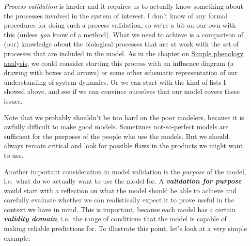 \documentclass[
]{book}
\begin{document}
\emph{Process validation} is harder and it requires us to actually know something about the processes involved in the system of interest. I don't know of any formal procedures for doing such a process validation, so we're a bit on our own with this (unless \emph{you} know of a method). What we need to achieve is a comparison of (our) knowledge about the biological processes that are at work with the set of processes that are included in the model. As in the chapter on \protect\hyperlink{simple_phenology}{Simple phenology analysis}, we could consider starting this process with an influence diagram (a drawing with boxes and arrows) or some other schematic representation of our understanding of system dynamics. Or we can start with the kind of lists I showed above, and see if we can convince ourselves that our model covers these issues.

Note that we probably shouldn't be too hard on the poor modelers, because it is awfully difficult to make good models. Sometimes not-so-perfect models are sufficient for the purposes of the people who use the models. But we should always remain critical and look for possible flaws in the products we might want to use.

Another important consideration in model validation is the \emph{purpose} of the model, i.e.~what do we actually want to use the model for. A \textbf{\emph{validation for purpose}} would start with a reflection on what the model should be able to achieve and carefully evaluate whether we can realistically expect it to prove useful in the context we have in mind. This is important, because each model has a certain \textbf{\emph{validity domain}}, i.e.~the range of conditions that the model is capable of making reliable predictions for. To illustrate this point, let's look at a very simple example:
\end{document}
